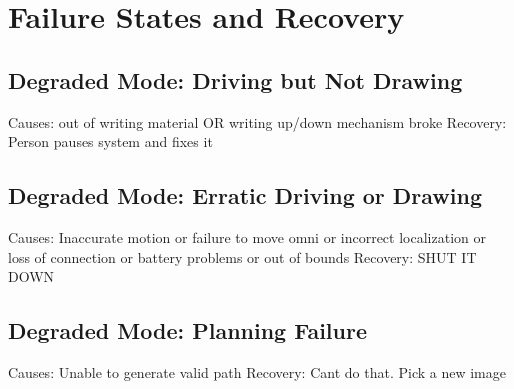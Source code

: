 
\section{Failure States and Recovery}
\label{sec:failure_states}


\subsection{Degraded Mode: Driving but Not Drawing}
Causes: out of writing material OR writing up/down mechanism broke
Recovery: Person pauses system and fixes it 

\subsection{Degraded Mode: Erratic Driving or Drawing}
Causes: Inaccurate motion or failure to move omni or incorrect localization or loss of connection or battery problems or out of bounds
Recovery: SHUT IT DOWN

\subsection{Degraded Mode: Planning Failure}
Causes: Unable to generate valid path
Recovery: Cant do that. Pick a new image
